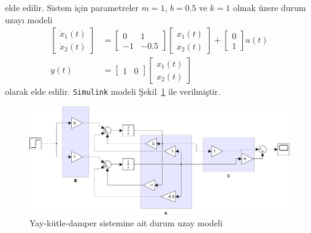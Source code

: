 elde edilir. Sistem için parametreler $m=1$, $b=0.5$ ve $k=1$ olmak üzere durum uzayı modeli
\begin{equation}
\begin{split}
    \begin{bmatrix}
        \dot{x}_1(t)\\
        \dot{x}_2(t)
    \end{bmatrix}&=
    \begin{bmatrix}
        0& 1\\
        -1& -0.5
    \end{bmatrix}\begin{bmatrix}
        x_1(t)\\
        x_2(t)
    \end{bmatrix}+\begin{bmatrix}
        0\\
        1
    \end{bmatrix}u(t)\\
    y(t)&=\begin{bmatrix}
        1&0 
    \end{bmatrix}\begin{bmatrix}
        x_1(t)\\
        x_2(t)
    \end{bmatrix}
\end{split}
\end{equation}
olarak elde edilir. \verb|Simulink| modeli Şekil~\ref{fig:model1} ile verilmiştir.
\begin{figure}[!htb]
    \centering
    \includegraphics[width=\textwidth]{img/model1}
    \caption{Yay-kütle-damper sistemine ait durum uzay modeli}
    \label{fig:model1}
\end{figure}

